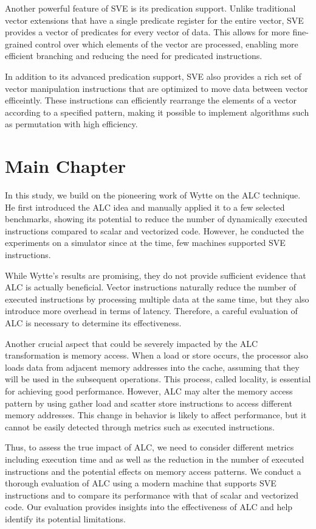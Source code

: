 \documentclass[\main/thesis.tex]{subfiles}
\begin{document}
Another powerful feature of SVE is its predication support. Unlike traditional vector extensions that have a single predicate register for the entire vector, SVE provides a vector of predicates for every vector of data. This allows for more fine-grained control over which elements of the vector are processed, enabling more efficient branching and reducing the need for predicated instructions.

In addition to its advanced predication support, SVE also provides a rich set of vector manipulation instructions that are optimized to move data between vector efficeintly. These instructions can efficiently rearrange the elements of a vector according to a specified pattern, making it possible to implement algorithms such as permutation with high efficiency.


\chapter{Main Chapter}


In this study, we build on the pioneering work of Wytte on the ALC technique. He first introduced the ALC idea and manually applied it to a few selected benchmarks, showing its potential to reduce the number of dynamically executed instructions compared to scalar and vectorized code. However, he conducted the experiments on a simulator since at the time, few machines supported SVE instructions.

While Wytte's results are promising, they do not provide sufficient evidence that ALC is actually beneficial. Vector instructions naturally reduce the number of executed instructions by processing multiple data at the same time, but they also introduce more overhead in terms of latency. Therefore, a careful evaluation of ALC is necessary to determine its effectiveness.

Another crucial aspect that could be severely impacted by the ALC transformation is memory access. When a load or store occurs, the processor also loads data from adjacent memory addresses into the cache, assuming that they will be used in the subsequent operations. This process, called locality, is essential for achieving good performance. However, ALC may alter the memory access pattern by using gather load and scatter store instructions to access different memory addresses. This change in behavior is likely to affect performance, but it cannot be easily detected through metrics such as executed instructions.

Thus, to assess the true impact of ALC, we need to consider different metrics including execution time and as well as the reduction in the number of executed instructions and the potential effects on memory access patterns. We conduct a thorough evaluation of ALC using a modern machine that supports SVE instructions and to compare its performance with that of scalar and vectorized code. Our evaluation provides insights into the effectiveness of ALC and help identify its potential limitations.
\end{document}
